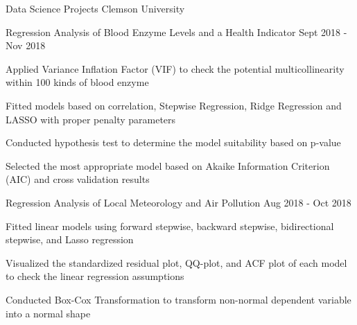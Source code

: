 \documentclass{resume} %
\begin{document}
\vspace{-0.2cm}
\begin{rSection}{Data Science Projects}		
	Clemson University \\
	\begin{rSubsection}{Regression Analysis of Blood Enzyme Levels and a Health Indicator}
		{Sept 2018 - Nov 2018}{}{}		
		\setlength{\parindent}{2em} \item Applied Variance Inflation Factor (VIF) to check the potential multicollinearity within 100 kinds of blood enzyme		
		\item Fitted models based on correlation, Stepwise Regression, Ridge Regression and LASSO with proper penalty parameters
		\item Conducted hypothesis test to determine the model suitability based on p-value
		\item Selected the most appropriate model based on Akaike Information Criterion (AIC) and cross validation results		
	\end{rSubsection}	
	\vspace{-0.15cm}
		\begin{rSubsection}{Regression Analysis of Local Meteorology and Air Pollution}
			{Aug 2018 - Oct 2018}{}{}		
			\setlength{\parindent}{2em} \item Fitted linear models using forward stepwise, backward stepwise, bidirectional stepwise, and Lasso regression
			\item Visualized the standardized residual plot, QQ-plot, and ACF plot of each model to check the linear regression assumptions
			\item Conducted Box-Cox Transformation to transform non-normal dependent variable into a normal shape		
		\end{rSubsection}	
\end{rSection}
\end{document}
